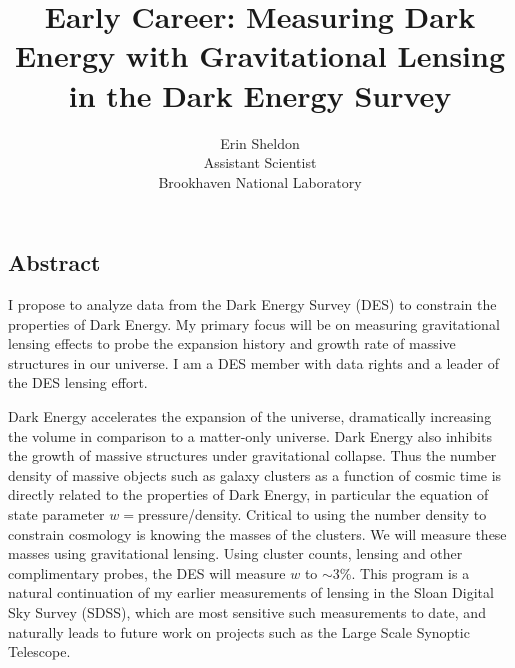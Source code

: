 \documentclass[12pt]{article}
\begin{document}
\newpage 



\tableofcontents


\newpage

\title{Early Career: Measuring Dark Energy with Gravitational Lensing in 
the Dark Energy Survey}
\author{Erin Sheldon\\
{\normalsize Assistant Scientist}\\
\normalsize{Brookhaven National Laboratory}}
\date{}
\maketitle



\begin{center}
\section*{Abstract}
\end{center}


I propose to analyze data from the Dark Energy Survey (DES) to constrain the
properties of Dark Energy.  My primary focus will be on measuring gravitational
lensing effects to probe the expansion history and growth rate of massive
structures in our universe.  I am a DES member with data rights and a leader of
the DES lensing effort.

Dark Energy accelerates the expansion of the universe, dramatically increasing
the volume in comparison to a matter-only universe.  Dark Energy also inhibits
the growth of massive structures under gravitational collapse.  Thus the number
density of massive objects such as galaxy clusters as a function of cosmic time
is directly related to the properties of Dark Energy, in particular the
equation of state parameter $w=$pressure/density.  Critical to using the number
density to constrain cosmology is knowing the masses of the clusters. We will
measure these masses using gravitational lensing.  Using cluster counts,
lensing and other complimentary probes, the DES will measure $w$ to $\sim$3\%.
This program is a natural continuation of my earlier measurements of lensing in
the Sloan Digital Sky Survey (SDSS), which are most sensitive such measurements
to date, and naturally leads to future work on projects such as the Large Scale
Synoptic Telescope\cite{lsstweb}.
\end{document}
